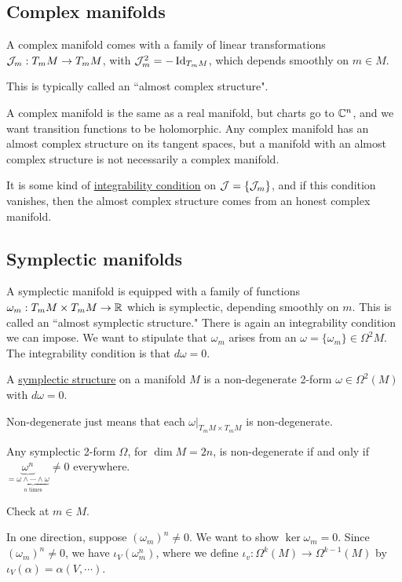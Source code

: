 \documentclass[x11names,reqno,14pt]{extarticle}
\begin{document}
\subsection*{Complex manifolds}

A complex manifold comes with a family of linear transformations $\mathcal{J}_m:T_mM\to T_mM$, with $\mathcal{J}_m^2 = -\operatorname{\mathrm{Id}}_{T_mM}$, which depends smoothly on $m\in M$. 

This is typically called an ``almost complex structure".

A complex manifold is the same as a real manifold, but charts go to $\mathbb{C}^n$, and we want transition functions to be holomorphic. Any complex manifold has an almost complex structure on its tangent spaces, but a manifold with an almost complex structure is not necessarily a complex manifold. 

It is some kind of \underline{integrability condition} on $\mathcal{J} = \{\mathcal{J}_m\}$, and if this condition vanishes, then the almost complex structure comes from an honest complex manifold. 

\subsection*{Symplectic manifolds}

A symplectic manifold is equipped with a family of functions $\omega_m:T_mM\times T_mM \to \mathbb{R}$ which is symplectic, depending smoothly on $m$. This is called an ``almost symplectic structure." There is again an integrability condition we can impose. We want to stipulate that $\omega_m$ arises from an $\omega = \{\omega_m\}\in \Omega^2M$. The integrability condition is that $d\omega = 0$. 


A \underline{symplectic structure} on a manifold $M$ is a non-degenerate 2-form $\omega\in\Omega^2(M)$ with $d\omega = 0$.

Non-degenerate just means that each $\omega|_{T_mM\times T_mM}$ is non-degenerate. 

\prop

Any symplectic 2-form $\Omega$, for $\dim M = 2n$, is non-degenerate if and only if $\underbrace{\omega^n}_{=\underbrace{\omega\wedge\cdots\wedge\omega}_{n\text{ times}}}\neq0$ everywhere. 

\proof

Check at $m \in M$. 

In one direction,  suppose $(\omega_m)^n\neq0$. We want to show $\ker\omega_m = 0$. Since $(\omega_m)^n \neq0$, we have $\iota_V(\omega_m^n)$, where we define $\iota_v:\Omega^k(M)\to\Omega^{k-1}(M)$ by $\iota_V(\alpha) = \alpha(V, \cdots)$. 
\end{document}
